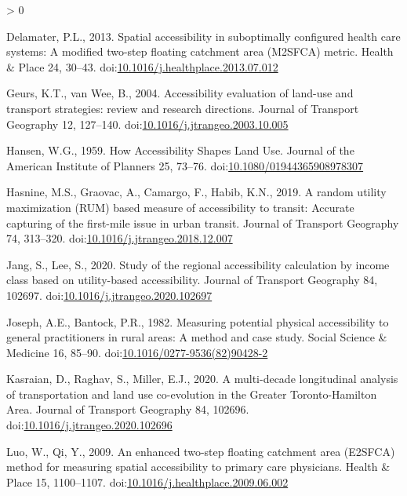 \documentclass[]{elsarticle} %
\newlength{\cslhangindent}
\newenvironment{CSLReferences}[2] %
 {%
  \setlength{\parindent}{0pt}
  \ifodd #1 \everypar{\setlength{\hangindent}{\cslhangindent}}\ignorespaces\fi
  \ifnum #2 > 0
  \setlength{\parskip}{#2\baselineskip}
  \fi
 }%
 {}
\begin{document}
\begin{CSLReferences}{1}{0}
\leavevmode\hypertarget{ref-delamater2013}{}%
Delamater, P.L., 2013. Spatial accessibility in suboptimally configured
health care systems: A modified two-step floating catchment area
(M2SFCA) metric. Health \& Place 24, 30--43.
doi:\href{https://doi.org/10.1016/j.healthplace.2013.07.012}{10.1016/j.healthplace.2013.07.012}

\leavevmode\hypertarget{ref-geurs2004}{}%
Geurs, K.T., van Wee, B., 2004. Accessibility evaluation of land-use and
transport strategies: review and research directions. Journal of
Transport Geography 12, 127--140.
doi:\href{https://doi.org/10.1016/j.jtrangeo.2003.10.005}{10.1016/j.jtrangeo.2003.10.005}

\leavevmode\hypertarget{ref-hansen1959}{}%
Hansen, W.G., 1959. How Accessibility Shapes Land Use. Journal of the
American Institute of Planners 25, 73--76.
doi:\href{https://doi.org/10.1080/01944365908978307}{10.1080/01944365908978307}

\leavevmode\hypertarget{ref-hasnine2019}{}%
Hasnine, M.S., Graovac, A., Camargo, F., Habib, K.N., 2019. A random
utility maximization (RUM) based measure of accessibility to transit:
Accurate capturing of the first-mile issue in urban transit. Journal of
Transport Geography 74, 313--320.
doi:\href{https://doi.org/10.1016/j.jtrangeo.2018.12.007}{10.1016/j.jtrangeo.2018.12.007}

\leavevmode\hypertarget{ref-jang2020}{}%
Jang, S., Lee, S., 2020. Study of the regional accessibility calculation
by income class based on utility-based accessibility. Journal of
Transport Geography 84, 102697.
doi:\href{https://doi.org/10.1016/j.jtrangeo.2020.102697}{10.1016/j.jtrangeo.2020.102697}

\leavevmode\hypertarget{ref-joseph1982}{}%
Joseph, A.E., Bantock, P.R., 1982. Measuring potential physical
accessibility to general practitioners in rural areas: A method and case
study. Social Science \& Medicine 16, 85--90.
doi:\href{https://doi.org/10.1016/0277-9536(82)90428-2}{10.1016/0277-9536(82)90428-2}

\leavevmode\hypertarget{ref-kasraian2020}{}%
Kasraian, D., Raghav, S., Miller, E.J., 2020. A multi-decade
longitudinal analysis of transportation and land use co-evolution in the
Greater Toronto-Hamilton Area. Journal of Transport Geography 84,
102696.
doi:\href{https://doi.org/10.1016/j.jtrangeo.2020.102696}{10.1016/j.jtrangeo.2020.102696}

\leavevmode\hypertarget{ref-luo2009}{}%
Luo, W., Qi, Y., 2009. An enhanced two-step floating catchment area
(E2SFCA) method for measuring spatial accessibility to primary care
physicians. Health \& Place 15, 1100--1107.
doi:\href{https://doi.org/10.1016/j.healthplace.2009.06.002}{10.1016/j.healthplace.2009.06.002}


\end{CSLReferences}
\end{document}
